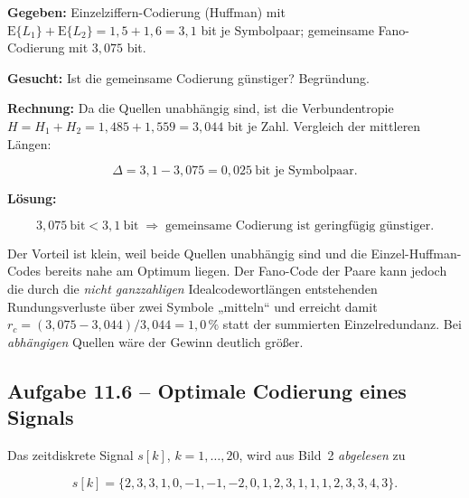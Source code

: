 \begin{beispiel}

\textbf{Gegeben:} Einzelziffern-Codierung (Huffman) mit
$\mathrm{E}\{L_1\} + \mathrm{E}\{L_2\} = 1{,}5 + 1{,}6 = 3{,}1$ bit je
Symbolpaar; gemeinsame Fano-Codierung mit $3{,}075$ bit.

\textbf{Gesucht:} Ist die gemeinsame Codierung günstiger? Begründung.

\textbf{Rechnung:} Da die Quellen unabhängig sind, ist die Verbundentropie
$H = H_1 + H_2 = 1{,}485 + 1{,}559 = 3{,}044$ bit je Zahl. Vergleich der
mittleren Längen:

$$
\Delta = 3{,}1 - 3{,}075 = 0{,}025\ \text{bit je Symbolpaar}.
$$

\textbf{Lösung:}

$$
\boxed{\;3{,}075\ \text{bit} < 3{,}1\ \text{bit} \;\Rightarrow\;
\text{gemeinsame Codierung ist geringfügig günstiger.}\;}
$$

Der Vorteil ist klein, weil beide Quellen unabhängig sind und die
Einzel-Huffman-Codes bereits nahe am Optimum liegen. Der Fano-Code der Paare
kann jedoch die durch die \emph{nicht ganzzahligen} Idealcodewortlängen
entstehenden Rundungsverluste über zwei Symbole „mitteln`` und erreicht damit
$r_c = (3{,}075 - 3{,}044)/3{,}044 = 1{,}0\,\%$ statt der summierten
Einzelredundanz. Bei \emph{abhängigen} Quellen wäre der Gewinn deutlich größer.

\end{beispiel}

\subsection*{Aufgabe 11.6 – Optimale Codierung eines Signals}

Das zeitdiskrete Signal $s[k]$, $k = 1,\dots,20$, wird aus Bild~2
\emph{abgelesen} zu

$$
s[k] = \{2,3,3,1,0,-1,-1,-2,0,1,2,3,1,1,1,2,3,3,4,3\}.
$$

\begin{center}
\end{center}


